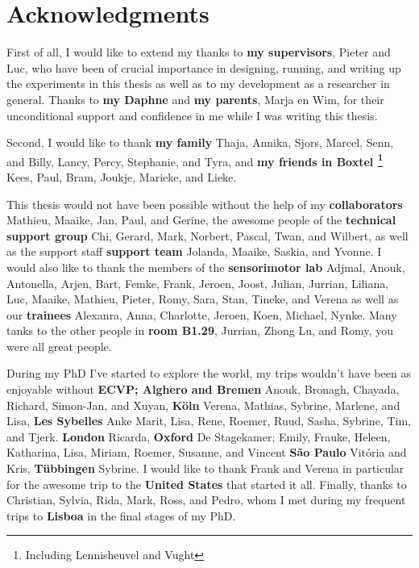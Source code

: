 \clearpage
\pagestyle{empty}

\chapter*{Acknowledgments}
{}

First of all, I would like to extend my thanks to \textbf{my supervisors}, Pieter and Luc, who have been of crucial importance in designing, running, and writing up the experiments in this thesis as well as to my development as a researcher in general. Thanks to \textbf{my Daphne} and \textbf{my parents}, Marja en Wim, for their unconditional support and confidence in me while I was writing this thesis.

Second, I would like to thank \textbf{my family} Thaja, Annika, Sjors, Marcel, Senn, and Billy, Lancy, Percy, Stephanie, and Tyra, and \textbf{my friends in Boxtel \footnote{Including Lennisheuvel and Vught}} Kees, Paul, Bram, Joukje, Marieke, and Lieke.


This thesis would not have been possible without the help of
my \textbf{collaborators} Mathieu, Maaike, Jan, Paul, and Gerine,
the awesome people of the
\textbf{technical support group} Chi, Gerard, Mark, Norbert, Pascal, Twan, and Wilbert,
as well as the support staff
\textbf{support team} Jolanda, Maaike, Saskia, and Yvonne.
I would also like to thank the members of the
\textbf{sensorimotor lab} Adjmal, Anouk, Antonella, Arjen, Bart, Femke, Frank, Jeroen, Joost, Julian, Jurrian, Liliana, Luc, Maaike, Mathieu, Pieter, Romy, Sara, Stan, Tineke, and Verena
as well as our
\textbf{trainees} Alexanra, Anna, Charlotte, Jeroen, Koen, Michael, Nynke.
Many tanks to the other people in \textbf{room B1.29}, Jurrian, Zhong Lu, and Romy, you were all great people.


During my PhD I've started to explore the world, my trips wouldn't have been as enjoyable without
\textbf{ECVP; Alghero and Bremen} Anouk, Bronagh, Chayada, Richard, Simon-Jan, and Xuyan,
\textbf{K\"oln} Verena, Mathias, Sybrine, Marlene, and Lisa,
\textbf{Les Sybelles} Anke Marit, Lisa, Rene, Roemer, Ruud, Sasha, Sybrine, Tim, and Tjerk.
\textbf{London} Ricarda,
\textbf{Oxford} De Stagekamer; Emily, Frauke, Heleen, Katharina, Lisa, Miriam, Roemer, Susanne, and Vincent
\textbf{S\~ao Paulo} Vit\'oria and Kris,
\textbf{T\"ubbingen} Sybrine.
I would like to thank Frank and Verena in particular for the awesome trip to the \textbf{United States} that started it all.
Finally, thanks to Christian, Sylvia, Rida, Mark, Ross, and Pedro, whom I met during my frequent trips to \textbf{Lisboa} in the final stages of my PhD.


